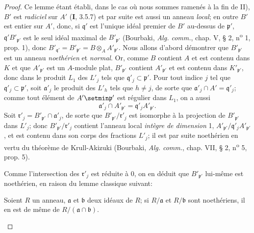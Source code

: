 \begin{proof}
Ce lemme étant établi, dans le cas où nous sommes ramenés à la fin de II),
$B'$ est \emph{radiciel} sur $A'$ (\textbf{I}, 3.5.7) et par suite est aussi un anneau
\emph{local}; en outre $B'$ est entier sur $A'$, donc, si $\mathfrak q'$ est
l'unique idéal premier de $B'$ au-dessus de $\mathfrak p'$,
$\mathfrak q'B'_{\mathfrak p'}$ est le seul idéal maximal de
$B'_{\mathfrak p'}$ (Bourbaki, \emph{Alg. comm.}, chap. V, § 2, n\textsuperscript{o} 1, prop.
1), donc $B'_{\mathfrak q'}=B'_{\mathfrak p'}=B\otimes_A
A'_{\mathfrak p'}$. Nous allons d'abord démontrer que
$B'_{\mathfrak p'}$ est un anneau \emph{noethérien} et \emph{normal}. Or, comme $B$
contient $A$ et est contenu dans $K$ et que $A'_{\mathfrak p'}$ est un
$A$-module plat, $B'_{\mathfrak p'}$ contient $A'_{\mathfrak p'}$ et est
contenu dans $K'_{\mathfrak p'}$, donc dans le produit $L_1$ des $L'_j$
tels que $\mathfrak q'_j\subset\mathfrak p'$. Pour tout indice $j$ tel que
$\mathfrak q'_j\subset\mathfrak p'$, soit $\mathfrak a'_j$ le produit des
$L'_h$ tels que $h\neq j$, de sorte que
$\mathfrak a'_j\cap A'=\mathfrak q'_j$; comme tout élément de
$A'\setmin\mathfrak p'$ est régulier dans $L_1$, on a aussi
\[
\mathfrak a'_j\cap A'_{\mathfrak p'}=
\mathfrak q'_jA'_{\mathfrak p'}.
\]
Soit $\mathfrak r'_j=B'_{\mathfrak p'}\cap\mathfrak a'_j$, de sorte que
$B'_{\mathfrak p'}/\mathfrak r'_j$ est isomorphe à la projection de
$B'_{\mathfrak p'}$ dans $L'_j$; donc $B'_{\mathfrak p'}/\mathfrak r'_j$
contient l'anneau local \emph{intègre de dimension} 1,
$A'_{\mathfrak p'}/\mathfrak q'_jA'_{\mathfrak p'}$, et est contenu dans
son corps des fractions $L'_j$; il est par suite noethérien en vertu du
théorème de Krull-Akizuki (Bourbaki, \emph{Alg. comm.}, chap. VII, § 2, n\textsuperscript{o} 5,
prop. 5).

Comme l'intersection des $\mathfrak r'_j$ est réduite à 0, on en déduit que
$B'_{\mathfrak p'}$ lui-même est noethérien, en raison du lemme classique
suivant:

\begin{lemma}[6.14.1.4]
\label{IV.2.s6.14.1.4-fr}
Soient $R$ un anneau, $\mathfrak a$ et $\mathfrak b$ deux idéaux de $R$; si
$R/\mathfrak a$ et $R/\mathfrak b$ sont noethériens, il en est de même de
$R/(\mathfrak a\cap\mathfrak b)$.
\end{lemma}


\end{proof}
